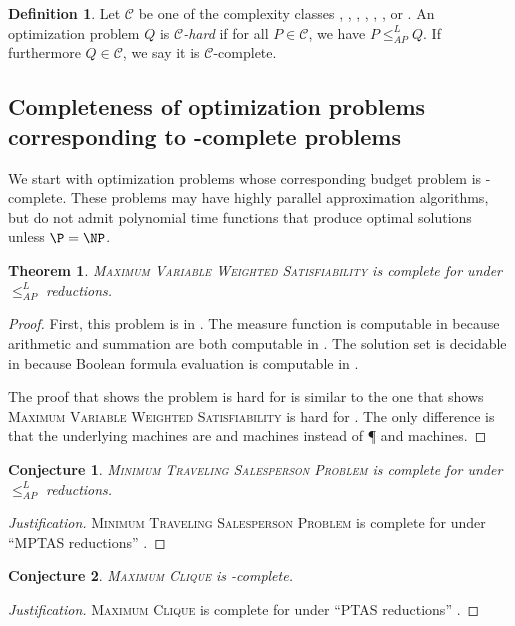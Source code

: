 \documentclass[]{article}
\theoremstyle{plain}
\newtheorem{conjecture}{Conjecture}
\newtheorem{theorem}{Theorem}
\theoremstyle{definition}
\newtheorem{definition}{Definition}
\newenvironment{justification}{\begin{proof}[Justification]}{\end{proof}}
\newcommand{\APr}{\leq_{AP}^{L}}
\begin{document}
\begin{definition}
  Let $\mathcal{C}$ be one of the complexity classes \NCO, \NCAS, \ApxNCO, \logApxNCO, \polyApxNCO, \expApxNCO, or \NNCO.
  An optimization problem $Q$ is \emph{$\mathcal{C}$-hard} if for all $P\in\mathcal{C}$, we have $P\APr Q$.
  If furthermore $Q\in\mathcal{C}$, we say it is $\mathcal{C}$-complete.
\end{definition}

\subsection{Completeness of optimization problems corresponding to \texorpdfstring{\NP}{NP}-complete problems}

We start with optimization problems whose corresponding budget problem is \NP-complete.
These problems may have highly parallel approximation algorithms, but do not admit polynomial time functions that produce optimal solutions unless $\P = \NP$.

\begin{theorem}
  \textsc{Maximum Variable Weighted Satisfiability} is complete for \NNCO{} under $\APr$ reductions.
\end{theorem}
\begin{proof}
  First, this problem is in \NNCO.
  The measure function is computable in \FNC{} because arithmetic and summation are both computable in \FNC{}.
  The solution set is decidable in \NC{} because Boolean formula evaluation is computable in \NC{} \cite{buss87}.

  The proof that shows the problem is hard for \NNCO{} is similar to the one that shows \textsc{Maximum Variable Weighted Satisfiability} is hard for \NPO{} \cite[Theorem~3.1]{om87} \cite[Theorem~8.3]{acgkmp99}.
  The only difference is that the underlying machines are \NC{} and \NNC{} machines instead of \P{} and \NP{} machines.
\end{proof}

\begin{conjecture}
  \textsc{Minimum Traveling Salesperson Problem} is complete for \expApxNCO{} under $\APr$ reductions.
\end{conjecture}
\begin{justification}
  \textsc{Minimum Traveling Salesperson Problem} is complete for \expApxPO{} under ``MPTAS reductions'' \cite[Corollary~1]{ep06}.
\end{justification}

\begin{conjecture}
  \textsc{Maximum Clique} is \polyApxNCO-complete.
\end{conjecture}
\begin{justification}
  \textsc{Maximum Clique} is complete for \polyApxPO{} under ``PTAS reductions'' \cite[Example~2.48]{cks01} \cite{kmsv99} \cite{ep10}.
\end{justification}
\end{document}
